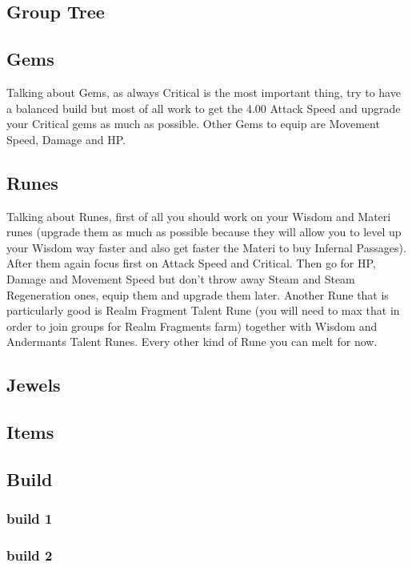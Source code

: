 \documentclass[14pt]{article}
\begin{document}
\subsection{Group Tree}

\subsection{Gems}
Talking about Gems, as always Critical is the most important thing, try to have a balanced build but most of all work to get the 4.00 Attack Speed and upgrade your Critical gems as much as possible.
Other Gems to equip are Movement Speed, Damage and HP.

\subsection{Runes}
Talking about Runes, first of all you should work on your Wisdom and Materi runes (upgrade them as much as possible because they will allow you to level up your Wisdom way faster and also get faster the Materi to buy Infernal Passages).
After them again focus first on Attack Speed and Critical. Then go for HP, Damage and Movement Speed but don't throw away Steam and Steam Regeneration ones, equip them and upgrade them later.
Another Rune that is particularly good is Realm Fragment Talent Rune (you will need to max that in order to join groups for Realm Fragments farm) together with Wisdom and Andermants Talent Runes.
Every other kind of Rune you can melt for now.

\subsection{Jewels}

\subsection{Items}

\subsection{Build}

\subsubsection{build 1}

\subsubsection{build 2}
\end{document}
